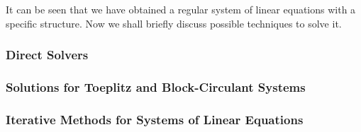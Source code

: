 It can be seen that we have obtained a regular system of linear equations with a specific structure. Now we shall briefly discuss possible techniques to solve it.

\subsubsection{Direct Solvers}


\subsubsection{Solutions for Toeplitz and Block-Circulant Systems}


\subsubsection{Iterative Methods for Systems of Linear Equations}

